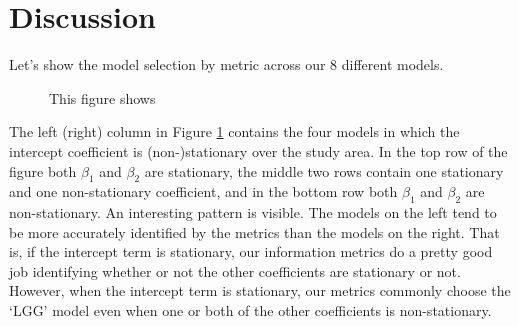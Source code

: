 \documentclass{article}\usepackage[]{graphicx}\usepackage[]{color}
\begin{document}
\section{Discussion}

Let's show the model selection by metric across our 8 different models.



\begin{figure}
\caption{This figure shows }
\label{fig:modelIdentificationAll8}
\end{figure}

The left (right) column in Figure \ref{fig:modelIdentificationAll8} contains the four models in which the intercept coefficient is (non-)stationary over the study area. In the top row of the figure both $\beta _1$ and $\beta _2$ are stationary, the middle two rows contain one stationary and one non-stationary coefficient, and in the bottom row both $\beta _1$ and $\beta _2$ are non-stationary. An interesting pattern is visible. The models on the left tend to be more accurately identified by the metrics than the models on the right. That is, if the intercept term is stationary, our information metrics do a pretty good job identifying whether or not the other coefficients are stationary or not. However, when the intercept term is stationary, our metrics commonly choose the `LGG' model even when one or both of the other coefficients is non-stationary. 
\end{document}
